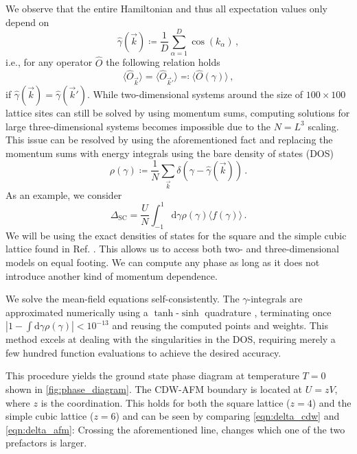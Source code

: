 \documentclass[
    reprint, 
    aps,
    preprintnumbers,
    twocolumn,
    prb,
    superscriptaddress
]{revtex4-2}
\newcommand{\vk}{\vec{k}}
\newcommand{\dgamma}{\mathrm{d}\gamma}
\begin{document}
We observe that the entire Hamiltonian and thus all expectation values only depend on
\begin{equation}
    \hat{\gamma}(\vk) \coloneqq \frac{1}{D} \sum_{\alpha=1}^D \cos(k_\alpha)\,,
\end{equation}
i.e., for any operator $\hat{O}$ the following relation holds 
\begin{equation}
    \label{eqn:equal_expecs}
    \langle \hat{O}_{\vk} \rangle = \langle \hat{O}_{\vk'} \rangle \eqqcolon \langle \hat{O}( \gamma ) \rangle\,,
\end{equation}
if $\hat{\gamma}(\vk) = \hat{\gamma}(\vk')$.
While two-dimensional systems around the size of $100\times100$ lattice sites can still be solved by using momentum sums,
computing solutions for large three-dimensional systems becomes impossible due to the $N=L^3$ scaling.
This issue can be resolved by using the aforementioned fact and replacing the momentum sums with energy integrals using the bare density of states (DOS)
\begin{equation}
    \rho(\gamma) \coloneqq  \frac{1}{N} \sum_{\vk} \delta \left(\gamma - \hat{\gamma} (\vk) \right)\,.
\end{equation}
As an example, we consider 
\begin{equation}
    \Delta_\text{SC} = \frac{U}{N} \int_{-1}^{1} \dgamma \rho(\gamma) \langle f( \gamma ) \rangle\,.
\end{equation}
We will be using the exact densities of states for the square and the simple cubic lattice found in Ref. \cite{Hanisch97}.
This allows us to access both two- and three-dimensional models on equal footing.
We can compute any phase as long as it does not introduce another kind of momentum dependence.

We solve the mean-field equations self-consistently.
The $\gamma$-integrals are approximated numerically using a $\tanh$-$\sinh$ quadrature \cite{takahasi73}, 
terminating once $|1 - \int \dgamma \rho(\gamma)| < 10^{-13}$ and reusing the computed points and weights.
This method excels at dealing with the singularities in the DOS, 
requiring merely a few hundred function evaluations to achieve the desired accuracy.

This procedure yields the ground state phase diagram at temperature $T=0$ shown in \autoref{fig:phase_diagram}.
The CDW-AFM boundary is located at $U = zV$, where $z$ is the coordination.
This holds for both the square lattice ($z=4$) and the simple cubic lattice ($z=6$) and can be seen by comparing \eqref{eqn:delta_cdw} and \eqref{eqn:delta_afm}:
Crossing the aforementioned line, changes which one of the two prefactors is larger.
\end{document}
